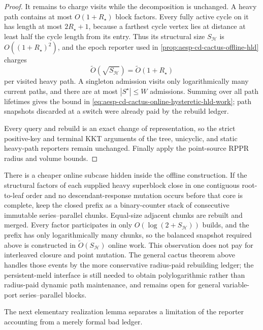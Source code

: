 \begin{proof}
It remains to charge visits while the decomposition is unchanged.  A heavy
path contains at most $O(1+R_\star)$ block factors.  Every fully active cycle
on it has length at most $2R_\star+1$, because a farthest cycle vertex lies
at distance at least half the cycle length from its entry.  Thus its
structural size $S_{\mathcal H}$ is
$O((1+R_\star)^2)$, and the epoch reporter used in
\cref{prop:aesp-cd-cactus-offline-hld} charges
\begin{equation*}
 \widetilde O(\sqrt{S_{\mathcal H}})
 =\widetilde O(1+R_\star)
\end{equation*}
per visited heavy path.  A singleton admission visits only logarithmically
many current paths, and there are at most $|S^\star|\leq W$ admissions.
Summing over all path lifetimes gives the bound in
\cref{eq:aesp-cd-cactus-online-hysteretic-hld-work}; path snapshots discarded
at a switch were already paid by the rebuild ledger.

Every query and rebuild is an exact change of representation, so the strict
positive-key and terminal KKT arguments of the tree, unicyclic, and static
heavy-path reporters remain unchanged.  Finally apply the point-source RPPR
radius and volume bounds.
\end{proof}

There is a cheaper online subcase hidden inside the offline construction.  If the
structural factors of each supplied heavy superblock close in one contiguous
root-to-leaf order and no descendant-response mutation occurs before that
core is complete, keep the closed prefix as a binary-counter stack of
consecutive immutable series--parallel chunks.  Equal-size adjacent chunks
are rebuilt and merged.  Every factor participates in only
$O(\log(2+S_{\mathcal H}))$ builds, and the prefix has only logarithmically
many chunks, so the balanced snapshot required above is constructed in
$\widetilde O(S_{\mathcal H})$ online work.  This observation does not pay for
interleaved closure and point mutation.  The general cactus theorem above
handles those events by the more conservative radius-paid rebuilding ledger;
the persistent-meld interface is still needed to obtain polylogarithmic
rather than radius-paid dynamic path maintenance, and remains open for
general variable-port series--parallel blocks.

The next elementary realization lemma separates a limitation of the reporter
accounting from a merely formal bad ledger.

